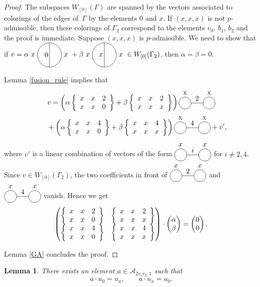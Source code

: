 \documentclass[11pt]{article}
\numberwithin{equation}{section}
\newtheorem{Lemma}[Theorem]{Lemma}
\begin{document}
\begin{proof}The subspaces $W_{[0]}(\Gamma)$ are spanned by the vectors associated to colorings of the edges of~$\Gamma$ by the elements $0$ and $x$. If $(x,x,x)$ is not $p$-admissible, then these colorings of $\Gamma_2$ correspond to the elements $v_0$, $b_1$, $b_2$ and the proof is immediate. Suppose $(x,x,x)$ is $p$-admissible. We need to show that if $v=\alpha \thetagraph{$x$}{0}{$x$} + \beta \thetagraph{$x$}{$x$}{$x$} \in W_{[0]}(\Gamma_2)$, then $\alpha=\beta = 0$.

Lemma \ref{fusion_rule} implies that
\begin{gather*}
v= \left( \alpha \sixj{x}{x}{2}{x}{x}{0} +\beta \sixj{x}{x}{2}{x}{x}{x} \right) \eyesgraph{x}{2}{x}\\
\hphantom{v=}{}+ \left( \alpha \sixj{x}{x}{4}{x}{x}{0} +\beta \sixj{x}{x}{4}{x}{x}{x} \right) \eyesgraph{x}{4}{x} + v',
\end{gather*}
where $v'$ is a linear combination of vectors of the form $\eyesgraph{$x$}{$i$}{$x$}$ for $i\neq 2,4$. Since $v\in W_{[0]}(\Gamma_2)$, the two coefficients in front of $\eyesgraph{$x$}{2}{$x$}$ and $\eyesgraph{$x$}{4}{$x$}$ vanish. Hence we get
\begin{gather*}\begin{pmatrix} \left\{ \begin{array}{ccc} x & x & 2 \\ x & x & 0 \end{array} \right\} & \left\{ \begin{array}{ccc} x & x & 2 \\ x & x & x \end{array} \right\} \\ \left\{ \begin{array}{ccc} x & x & 4 \\ x & x & 0 \end{array} \right\} & \left\{ \begin{array}{ccc} x & x & 4 \\ x & x & x \end{array} \right\} \end{pmatrix} \cdot \begin{pmatrix} \alpha \\ \beta \end{pmatrix} = \begin{pmatrix} 0\\0 \end{pmatrix}.\end{gather*}

Lemma \ref{GA} concludes the proof.
\end{proof}

\begin{Lemma}\label{lemmalacon}
There exists an element $a \in \mathcal{A}_{2r_1r_2,1}$ such that
\begin{gather*}
a\cdot u_0 = u_x, \qquad a \cdot u_x = u_0.
\end{gather*}
\end{Lemma}
\end{document}
